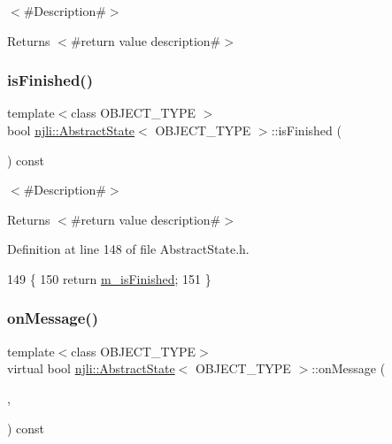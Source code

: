 $<$\#\+Description\#$>$

\begin{DoxyReturn}{Returns}
$<$\#return value description\#$>$ 
\end{DoxyReturn}
\mbox{\label{classnjli_1_1_abstract_state_a4c7007210237496fbe169ba114c3750d}} 
\subsubsection{\texorpdfstring{is\+Finished()}{isFinished()}}
{\footnotesize\ttfamily template$<$class O\+B\+J\+E\+C\+T\+\_\+\+T\+Y\+PE $>$ \\
bool \mbox{\hyperlink{classnjli_1_1_abstract_state}{njli\+::\+Abstract\+State}}$<$ O\+B\+J\+E\+C\+T\+\_\+\+T\+Y\+PE $>$\+::is\+Finished (\begin{DoxyParamCaption}{ }\end{DoxyParamCaption}) const\hspace{0.3cm}{\ttfamily [virtual]}}

$<$\#\+Description\#$>$

\begin{DoxyReturn}{Returns}
$<$\#return value description\#$>$ 
\end{DoxyReturn}


Definition at line 148 of file Abstract\+State.\+h.


\begin{DoxyCode}
149   \{
150     \textcolor{keywordflow}{return} \mbox{\hyperlink{classnjli_1_1_abstract_state_a445a5d1ac7572b8b01b81937c89e960c}{m\_isFinished}};
151   \}
\end{DoxyCode}
\mbox{\label{classnjli_1_1_abstract_state_aa486b2e60e57d789855acdfb555a4cdc}} 
\subsubsection{\texorpdfstring{on\+Message()}{onMessage()}}
{\footnotesize\ttfamily template$<$class O\+B\+J\+E\+C\+T\+\_\+\+T\+Y\+PE$>$ \\
virtual bool \mbox{\hyperlink{classnjli_1_1_abstract_state}{njli\+::\+Abstract\+State}}$<$ O\+B\+J\+E\+C\+T\+\_\+\+T\+Y\+PE $>$\+::on\+Message (\begin{DoxyParamCaption}\item[{O\+B\+J\+E\+C\+T\+\_\+\+T\+Y\+PE $\ast$}]{,  }\item[{const \mbox{\hyperlink{classnjli_1_1_telegram}{Telegram}} \&}]{ }\end{DoxyParamCaption}) const\hspace{0.3cm}{\ttfamily [pure virtual]}}

